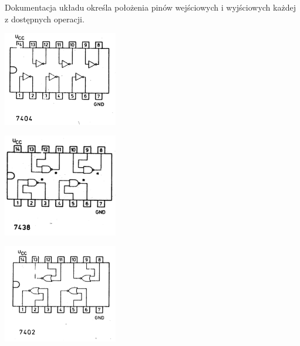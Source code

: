 \documentclass[a4paper,12pt]{article}
\begin{document}
Dokumentacja układu określa położenia pinów wejściowych i wyjściowych każdej z dostępnych operacji.

\begin{table}[h!]
\centering
\begin{minipage}{5cm}
   \centering
   \includegraphics[width=5cm]{grafika/cemi/6not.png}
\end{minipage}
\begin{minipage}{5cm}
   \centering
   \includegraphics[width=5cm]{grafika/cemi/4nand.png}
\end{minipage}
\begin{minipage}{5cm}
   \centering
   \includegraphics[width=5cm]{grafika/cemi/4nor.png}
\end{minipage}


\end{table}
\end{document}
